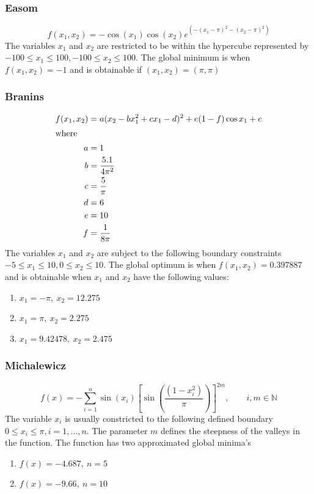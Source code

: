 \subsubsection{Easom}
\begin{equation}
	f(x_1,x_2) = -\cos(x_1)\cos(x_2)e^{(-(x_1 - \pi)^2 - (x_2 - \pi)^2)}
\end{equation}
The variables $x_1$ and $x_2$ are restricted to be within the hypercube represented by $-100 \leq x_1 \leq 100, -100 \leq x_2 \leq 100$. The global minimum is when $f(x_1,x_2) = -1$ and is obtainable if $(x_1,x_2) = (\pi,\pi)$
\subsubsection{Branins}
\begin{align}
	f(x_1,x_2) &= a(x_2 - bx_1^2 + cx_1 - d)^2 + e(1-f)\cos{x_1} + e \\
\intertext{where}
	a &= 1\nonumber\\
	b &= \frac{5.1}{4\pi^2}\nonumber\\
	c &= \frac{5}{\pi}\nonumber\\
	d &= 6\nonumber\\
	e &= 10\nonumber\\
	f &= \frac{1}{8\pi}\nonumber
\end{align}
The variables $x_1$ and $x_2$ are subject to the following boundary constraints $-5\leq x_1 \leq 10, 0 \leq x_2 \leq 10$. The global optimum is when $f(x_1,x_2) = 0.397887$ and is obtainable when $x_1$ and $x_2$ have the following values:
\begin{enumerate}
\item $x_1 = -\pi,\:x_2=12.275$
\item $x_1 = \pi,\:x_2=2.275$
\item $x_1 = 9.42478,\:x_2=2.475$
\end{enumerate}
\subsubsection{Michalewicz}
\begin{equation}
	f(x) = -\sum_{i=1}^n\sin{(x_i)}[\sin{(\frac{(1 - x_i^2)}{\pi})}]^{2m}, \qquad i,m \in \mathbb{N}
\end{equation}
The variable $x_i$ is usually constricted to the following defined boundary $0 \leq x_i \leq \pi, i = 1,\ldots,n$. The parameter $m$ defines the steepness of the valleys in the function. The function has two approximated global minima's
\begin{enumerate}
\item $f(x) = -4.687,\: n = 5$
\item $f(x) = -9.66,\: n = 10$
\end{enumerate}
